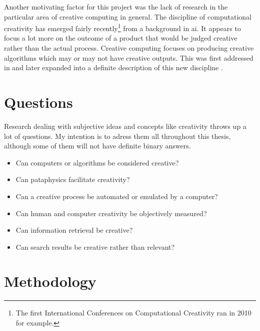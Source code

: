 

Another motivating factor for this project was the lack of research in the particular area of creative computing in general. The discipline of computational creativity has emerged fairly recently\footnote{The first International Conferences on Computational Creativity ran in 2010 for example.} from a background in \gls{ai}. It appears to focus a lot more on the outcome of a product that would be judged creative rather than the actual process. Creative computing focuses on producing creative algorithms which may or may not have creative outputs. This was first addressed in \autocite{Raczinski2013} and later expanded into a definite description of this new discipline \autocite{Hugill2013c}.


\section{Questions}

Research dealing with subjective ideas and concepts like creativity throws up a lot of questions. My intention is to adress them all throughout this thesis, although some of them will not have definite binary answers.


\begin{itemize}
  \item Can computers or algorithms be considered creative?
  \item Can pataphysics facilitate creativity?
  \item Can a creative process be automated or emulated by a computer?
  \item Can human and computer creativity be objectively measured?
  \item Can information retrieval be creative?
  \item Can search results be creative rather than relevant?
\end{itemize}


\section{Methodology}

